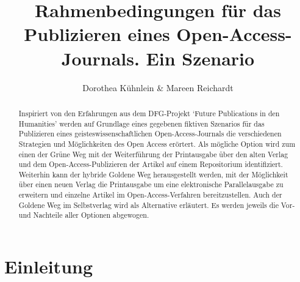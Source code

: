 \documentclass[a4paper,
fontsize=11pt,
oneside,
numbers=noperiodatend,
parskip=half-,
bibliography=totoc,
final
]{scrartcl}
\title{\LARGE{Rahmenbedingungen für das Publizieren eines Open-Access-Journals. Ein Szenario}} %
\author{Dorothea Kühnlein \& Mareen Reichardt} %
\date{}
\begin{document}
\maketitle
\thispagestyle{fancyplain} 

\begin{abstract}
Inspiriert von den Erfahrungen aus dem DFG-Projekt `Future Publications
in den Humanities' werden auf Grundlage eines gegebenen fiktiven
Szenarios für das Publizieren eines geisteswissenschaftlichen
Open-Access-Journals die verschiedenen Strategien und Möglichkeiten des
Open Access erörtert. Als mögliche Option wird zum einen der Grüne Weg
mit der Weiterführung der Printausgabe über den alten Verlag und dem
Open-Access-Publizieren der Artikel auf einem Repositorium
identifiziert. Weiterhin kann der hybride Goldene Weg herausgestellt
werden, mit der Möglichkeit über einen neuen Verlag die Printausgabe um
eine elektronische Parallelausgabe zu erweitern und einzelne Artikel im
Open-Access-Verfahren bereitzustellen. Auch der Goldene Weg im
Selbstverlag wird als Alternative erläutert. Es werden jeweils die Vor-
und Nachteile aller Optionen abgewogen.
\end{abstract}

\section*{Einleitung}\label{einleitung}
\end{document}
